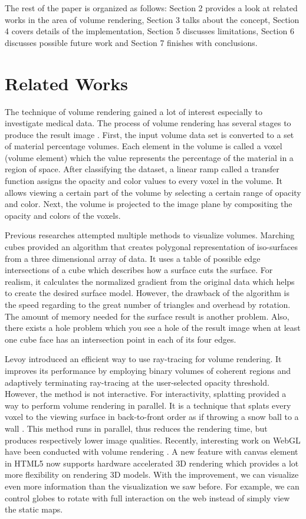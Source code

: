 \documentclass[annual]{acmsiggraph}
\begin{document}
The rest of the paper is organized as follows: Section 2 provides a look at related works in the area of volume rendering, Section 3 talks about the concept, Section 4 covers details of the implementation, Section 5 discusses limitations, Section 6 discusses possible future work and Section 7 finishes with conclusions.


\section{Related Works}
The technique of volume rendering gained a lot of interest especially to investigate medical data. The process of volume rendering has several stages to produce the result image \cite{drebin:1988}. First, the input volume data set is converted to a set of material percentage volumes. Each element in the volume is called a voxel (volume element) which the value represents the percentage of the material in a region of space. After classifying the dataset, a linear ramp called a transfer function assigns the opacity and color values to every voxel in the volume. It allows viewing a certain part of the volume by selecting a certain range of opacity and color. Next, the volume is projected to the image plane by compositing the opacity and colors of the voxels. 

Previous researches attempted multiple methods to visualize volumes. Marching cubes \cite{lorensen:1987} provided an algorithm that creates polygonal representation of iso-surfaces from a three dimensional array of data. It uses a table of possible edge intersections of a cube which describes how a surface cuts the surface. For realism, it calculates the normalized gradient from the original data which helps to create the desired surface model. However, the drawback of the algorithm is the speed regarding to the great number of triangles and overhead by rotation. The amount of memory needed for the surface result is another problem. Also, there exists a hole problem which you see a hole of the result image when at least one cube face has an intersection point in each of its four edges.

Levoy\cite{levoy:1990} introduced an efficient way to use ray-tracing for volume rendering. It improves its performance by employing binary volumes of coherent regions and adaptively terminating ray-tracing at the user-selected opacity threshold. However, the method is not interactive.
For interactivity, splatting provided a way to perform volume rendering in parallel. It is a technique that splats every voxel to the viewing surface in back-to-front order as if throwing a snow ball to a wall \cite{westover:1991}. This method runs in parallel, thus reduces the rendering time, but produces respectively lower image qualities. 
Recently, interesting work on WebGL have been conducted with volume rendering \cite{anatomical:2011}. 
A new feature with canvas element in HTML5 now supports hardware accelerated 3D rendering which provides a lot more flexibility on rendering 3D models. With the improvement, we can visualize even more information than the visualization we saw before. For example, we can control globes to rotate with full interaction on the web instead of simply view the static maps.
\end{document}
